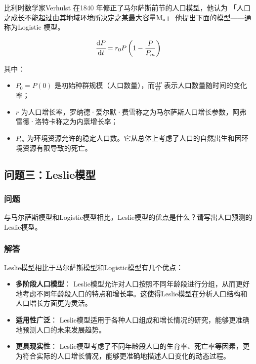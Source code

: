 \documentclass[a4,10pt,zihao=-4]{ctexart}
\begin{document}
比利时数学家Verhulst 在1840 年修正了马尔萨斯前节的人口模型，他认为
「人口之成长不能超过由其地域环境所决定之某最大容量M。」
他提出下面的模型——通称为Logistic 模型。

\begin{equation*}
    \cfrac{\text{d}P}{\text{d}t} = r_0 P\left(1-\frac{P}{P_m}\right)
\end{equation*}

 
 
其中：
\begin{itemize}
    \item $P_0 = P(0)$ 是初始种群规模（人口数量），而$\frac{\text{d}P}{\text{d}t}$ 表示人口数量随时间的变化率；
    \item $r$ 为人口增长率，罗纳德·爱尔默·费雪称之为马尔萨斯人口增长参数，阿弗雷德·洛特卡称之为内禀增长率；
    \item $P_m$ 为环境资源允许的稳定人口数。它从总体上考虑了人口的自然出生和因环境资源有限导致的死亡。
\end{itemize}


\subsection{问题三：Leslie模型}
\subsubsection{问题}
与马尔萨斯模型和Logistic模型相比，Leslie模型的优点是什么？请写出人口预测的Leslie模型。

\subsubsection{解答}
Leslie模型相比于马尔萨斯模型和Logistic模型有几个优点：

\begin{itemize}
    \item \textbf{多阶段人口模型}： Leslie模型允许对人口按照不同年龄段进行分组，从而更好地考虑不同年龄段人口的特点和增长率。这使得Leslie模型在分析人口结构和人口增长方面更为灵活。

    \item \textbf{适用性广泛}： Leslie模型适用于各种人口组成和增长情况的研究，能够更准确地预测人口的未来发展趋势。

    \item \textbf{更具现实性}： Leslie模型考虑了不同年龄段人口的生育率、死亡率等因素，更为符合实际的人口增长情况，能够更准确地描述人口变化的动态过程。
\end{itemize}
\end{document}
